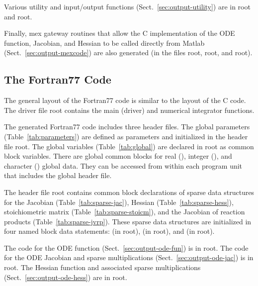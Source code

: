 \documentclass[twoside]{article}
\newcommand{\kpproot}{{\sc root}}
\begin{document}
Various utility and input/output functions (Sect.~\ref{sec:output-utility})
are in \kpproot{} and \kpproot{}.

Finally, mex gateway routines that allow the C implementation of the ODE
function, Jacobian, and Hessian to be called directly from Matlab
(Sect.~\ref{sec:output-mexcode}) are also generated (in the files
\kpproot{}, \kpproot{}, and
\kpproot{}).

\subsection{The Fortran77 Code}
\label{sec:f77}

The general layout of the Fortran77 code is similar to the layout of the C
code. The driver file \kpproot{} contains the main (driver) and
numerical integrator functions.

The generated Fortran77 code includes three header files. The global
parameters (Table~\ref{tab:parameters}) are defined as parameters and
initialized in the header file \kpproot{}. The global
variables (Table~\ref{tab:global}) are declared in
\kpproot{} as common block variables. There are global
common blocks for real (), integer (), and
character () global data. They can be accessed from
within each program unit that includes the global header file.

The header file \kpproot{} contains common block
declarations of sparse data structures for the Jacobian
(Table~\ref{tab:sparse-jac}), Hessian (Table~\ref{tab:sparse-hess}),
stoichiometric matrix (Table~\ref{tab:sparse-stoicm}), and the Jacobian
of reaction products (Table~\ref{tab:sparse-jvrp}). These sparse data
structures are initialized in four named block data statements:
 (in \kpproot{}),
 (in \kpproot{}),
 and  (in
\kpproot{}).

The code for the ODE function (Sect.~\ref{sec:output-ode-fun}) is in
\kpproot{}. The code for the ODE Jacobian and sparse
multiplications (Sect.~\ref{sec:output-ode-jac}) is in
\kpproot{}. The Hessian function and associated sparse
multiplications (Sect.~\ref{sec:output-ode-hess}) are in
\kpproot{}.
\end{document}
